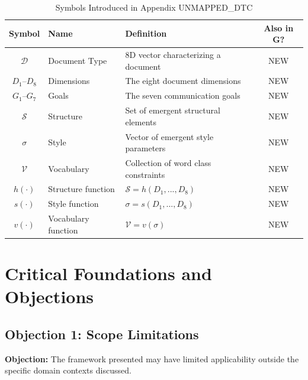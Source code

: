 \vspace{0.5em}

\begin{table}[htbp]
\centering
\caption{Symbols Introduced in Appendix UNMAPPED_DTC}
\label{tab:doctype-symbols}
\renewcommand{\arraystretch}{1.3}
\begin{tabular}{@{}clp{6cm}c@{}}
\toprule
\textbf{Symbol} & \textbf{Name} & \textbf{Definition} & \textbf{Also in G?} \\
\midrule
$\mathcal{D}$ & Document Type & 8D vector characterizing a document & NEW \\
$D_1$--$D_8$ & Dimensions & The eight document dimensions & NEW \\
$G_1$--$G_7$ & Goals & The seven communication goals & NEW \\
$\mathcal{S}$ & Structure & Set of emergent structural elements & NEW \\
$\sigma$ & Style & Vector of emergent style parameters & NEW \\
$\mathcal{V}$ & Vocabulary & Collection of word class constraints & NEW \\
$h(\cdot)$ & Structure function & $\mathcal{S} = h(D_1,...,D_8)$ & NEW \\
$s(\cdot)$ & Style function & $\sigma = s(D_1,...,D_8)$ & NEW \\
$v(\cdot)$ & Vocabulary function & $\mathcal{V} = v(\sigma)$ & NEW \\
\bottomrule
\end{tabular}
\end{table}



\section{Critical Foundations and Objections}
\label{sec:dtc-foundations}

\subsection{Objection 1: Scope Limitations}

\textbf{Objection:} The framework presented may have limited applicability
outside the specific domain contexts discussed.

